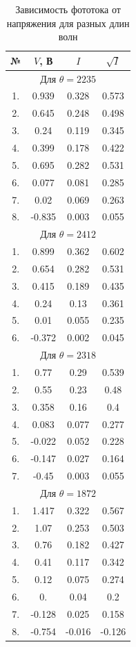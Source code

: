 \documentclass[12pt]{kiarticle} %
\begin{document}
\begin{table}[h!]
	\caption{Зависимость фототока от напряжения для разных длин волн}
	\begin{center}
		\begin{tabular}{|c|c|c|c|}
			\hline
			№ & $ V $, В & $ I $ & $ \sqrt{I}  $ \\
			\hline
			\multicolumn{4}{|c|}{Для $ \theta = 2235 $} \\
			\hline
			1. & 0.939 & 0.328 & 0.573 \\
			2. & 0.645 & 0.248 & 0.498 \\
			3. & 0.24 & 0.119 & 0.345 \\
			4. & 0.399 & 0.178 & 0.422 \\
			5. & 0.695 & 0.282 & 0.531 \\
			6. & 0.077 & 0.081 & 0.285 \\
			7. & 0.02 & 0.069 & 0.263 \\
			8. & -0.835 & 0.003 & 0.055 \\
			\hline 
			\multicolumn{4}{|c|}{Для $ \theta = 2412 $} \\
			\hline
			1. & 0.899 & 0.362 & 0.602 \\
			2. & 0.654 & 0.282 & 0.531 \\
			3. & 0.415 & 0.189 & 0.435 \\
			4. & 0.24 & 0.13 & 0.361 \\
			5. & 0.01 & 0.055 & 0.235 \\
			6. & -0.372 & 0.002 & 0.045 \\
			\hline 
			\multicolumn{4}{|c|}{Для $ \theta = 2318 $} \\
			\hline
			1. & 0.77 & 0.29 & 0.539 \\
			2. & 0.55 & 0.23 & 0.48 \\
			3. & 0.358 & 0.16 & 0.4 \\
			4. & 0.083 & 0.077 & 0.277 \\
			5. & -0.022 & 0.052 & 0.228 \\
			6. & -0.147 & 0.027 & 0.164 \\
			7. & -0.45 & 0.003 & 0.055 \\
			\hline 
			\multicolumn{4}{|c|}{Для $ \theta = 1872 $} \\
			\hline
			1. & 1.417 & 0.322 & 0.567 \\
			2. & 1.07 & 0.253 & 0.503 \\
			3. & 0.76 & 0.182 & 0.427 \\
			4. & 0.41 & 0.117 & 0.342 \\
			5. & 0.12 & 0.075 & 0.274 \\
			6. & 0. & 0.04 & 0.2 \\
			7. & -0.128 & 0.025 & 0.158 \\
			8. & -0.754 & -0.016 & -0.126 \\
			\hline
		\end{tabular} 
	\end{center}
	\label{}
\end{table}
\end{document}
